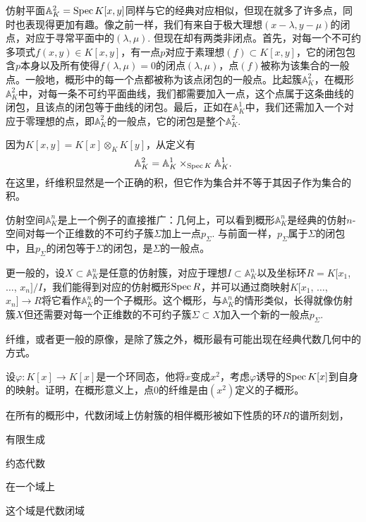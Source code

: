 仿射平面$\mathbb{A}^2_K=\operatorname{Spec} K[x,y]$同样与它的经典对应相似，但现在就多了许多点，同时也表现得更加有趣。像之前一样，我们有来自于极大理想$(x-\lambda,y-\mu)$的闭点，对应于寻常平面中的$(\lambda,\mu)$. 但现在却有两类非闭点。首先，对每一个不可约多项式$f(x,y)\in K[x,y]$，有一点$p$对应于素理想$(f)\subset K[x,y]$，它的闭包包含$p$本身以及所有使得$f(\lambda,\mu)=0$的闭点$(\lambda,\mu)$，点$(f)$被称为该集合的一般点。一般地，概形中的每一个点都被称为该点闭包的一般点。比起簇$\mathbb{A}^2_K$，在概形$\mathbb{A}^2_K$中，对每一条不可约平面曲线，我们都需要加入一点，这个点属于这条曲线的闭包，且该点的闭包等于曲线的闭包。最后，正如在$\mathbb{A}^1_K$中，我们还需加入一个对应于零理想的点，即$\mathbb{A}^2_K$的一般点，它的闭包是整个$\mathbb{A}^2_K$.


因为$K[x,y]=K[x]\otimes_K K[y]$，从定义有
\[
	\mathbb{A}^2_K=\mathbb{A}^1_K\times_{\operatorname{Spec} K}\mathbb{A}^1_K.
\]
在这里，纤维积显然是一个正确的积，但它作为集合并不等于其因子作为集合的积。

仿射空间$\mathbb{A}^n_K$是上一个例子的直接推广：几何上，可以看到概形$\mathbb{A}^n_K$是经典的仿射$n$-空间对每一个正维数的不可约子簇$\Sigma$加上一点$p_\Sigma$. 与前面一样，$p_\Sigma$属于$\Sigma$的闭包中，且$p_\Sigma$的闭包等于$\Sigma$的闭包，是$\Sigma$的一般点。

更一般的，设$X\subset \mathbb{A}^n_K$是任意的仿射簇，对应于理想$I\subset \mathbb{A}^n_K$以及坐标环$R=K[x_1$, $\dots$, $x_n]/I$，我们能得到对应的仿射概形$\operatorname{Spec} R$，并可以通过商映射$K[x_1$, $\dots$, $x_n]\to R$将它看作$\mathbb{A}^n_K$的一个子概形。这个概形，与$\mathbb{A}^n_K$的情形类似，长得就像仿射簇$X$但还需要对每一个正维数的不可约子簇$\Sigma\subset X$加入一个新的一般点$p_\Sigma$.

纤维，或者更一般的原像，是除了簇之外，概形最有可能出现在经典代数几何中的方式。

\begin{exe} \label{exe:2.2}
设$\varphi:K[x]\to K[x]$是一个环同态，他将$x$变成$x^2$，考虑$\varphi$诱导的$\operatorname{Spec} K[x]$到自身的映射。证明，在概形意义上，点$0$的纤维是由$(x^2)$定义的子概形。

\end{exe}

在所有的概形中，代数闭域上仿射簇的相伴概形被如下性质的环$R$的谱所刻划，
\begin{compactitem}[~~~--]
\item 有限生成
\item 约态代数
\item 在一个域上
\item 这个域是代数闭域
\end{compactitem}

